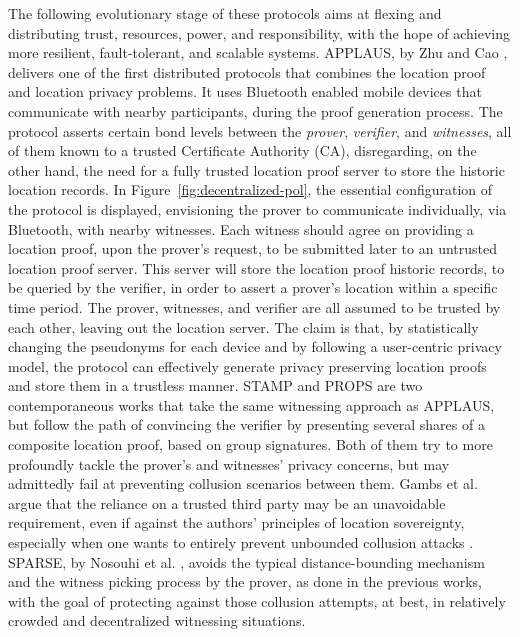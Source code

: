 The following evolutionary stage of these protocols aims at flexing and distributing trust, resources, power, and responsibility, with the hope of achieving more resilient, fault-tolerant, and scalable systems. APPLAUS, by Zhu and Cao \cite{zhu2011applaus}, delivers one of the first distributed protocols that combines the location proof and location privacy problems. It uses Bluetooth enabled mobile devices that communicate with nearby participants, during the proof generation process. The protocol asserts certain bond levels between the \emph{prover}, \emph{verifier}, and \emph{witnesses}, all of them known to a trusted Certificate Authority (CA), disregarding, on the other hand, the need for a fully trusted location proof server to store the historic location records. In Figure~\ref{fig:decentralized-pol}, the essential configuration of the protocol is displayed, envisioning the prover to communicate individually, via Bluetooth, with nearby witnesses. Each witness should agree on providing a location proof, upon the prover's request, to be submitted later to an untrusted location proof server. This server will store the location proof historic records, to be queried by the verifier, in order to assert a prover's location within a specific time period. The prover, witnesses, and verifier are all assumed to be trusted by each other, leaving out the location server. The claim is that, by statistically changing the pseudonyms for each device and by following a user-centric privacy model, the protocol can effectively generate privacy preserving location proofs and store them in a trustless manner. STAMP \cite{wang2016stamp} and PROPS \cite{gambs2014props} are two contemporaneous works that take the same witnessing approach as APPLAUS, but follow the path of convincing the verifier by presenting several shares of a composite location proof, based on group signatures. Both of them try to more profoundly tackle the prover's and witnesses' privacy concerns, but may admittedly fail at preventing collusion scenarios between them. Gambs et al. argue that the reliance on a trusted third party may be an unavoidable requirement, even if against the authors' principles of location sovereignty, especially when one wants to entirely prevent unbounded collusion attacks \cite{gambs2014props}. SPARSE, by Nosouhi et al. \cite{nosouhi2018sparse}, avoids the typical distance-bounding mechanism and the witness picking process by the prover, as done in the previous works, with the goal of protecting against those collusion attempts, at best, in relatively crowded and decentralized witnessing situations. 

